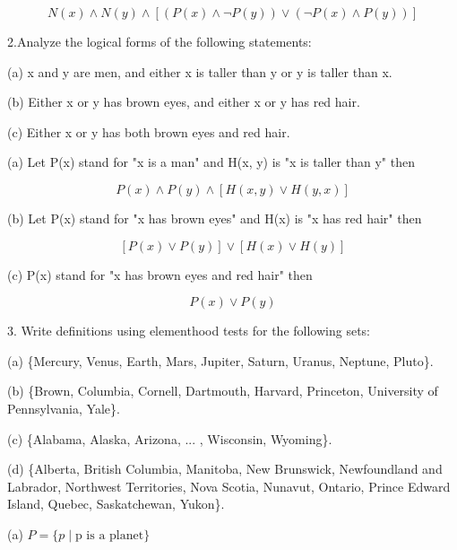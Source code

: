 \documentclass{article}
\begin{document}
$$N(x) \land N(y) \land [(P(x) \land \neg P(y)) \lor (\neg P(x) \land P(y))]$$
\vspace{30pt}

2.Analyze the logical forms of the following statements:

\hspace{12pt}(a) x and y are men, and either x is taller than y or y is taller than x.

\hspace{12pt}(b) Either x or y has brown eyes, and either x or y has red hair.

\hspace{12pt}(c) Either x or y has both brown eyes and red hair.
\vspace{20pt}

(a) Let P(x) stand for "x is a man" and H(x, y) is "x is taller than y" then

$$P(x) \land P(y) \land [H(x, y) \lor H(y, x)]$$
\vspace{10pt}

(b) Let P(x) stand for "x has brown eyes" and H(x) is "x has red hair" then

$$[P(x) \lor P(y)] \lor [H(x) \lor H(y)]$$
\vspace{10pt}

(c) P(x) stand for "x has brown eyes and red hair" then

$$P(x) \lor P(y)$$
\vspace{30pt}

3. Write definitions using elementhood tests for the following sets:

\hspace{12pt}(a) \{Mercury, Venus, Earth, Mars, Jupiter, Saturn, Uranus, Neptune,
Pluto\}.

\hspace{12pt}(b) \{Brown, Columbia, Cornell, Dartmouth, Harvard, Princeton, University
of Pennsylvania, Yale\}.

\hspace{12pt}(c) \{Alabama, Alaska, Arizona, ... , Wisconsin, Wyoming\}.

\hspace{12pt}(d) \{Alberta, British Columbia, Manitoba, New Brunswick, Newfoundland
and Labrador, Northwest Territories, Nova Scotia, Nunavut, Ontario,
Prince Edward Island, Quebec, Saskatchewan, Yukon\}.
\vspace{20pt}

(a) $P = \{ p \mid \text{p is a planet} \}$
\vspace{10pt}
\end{document}
